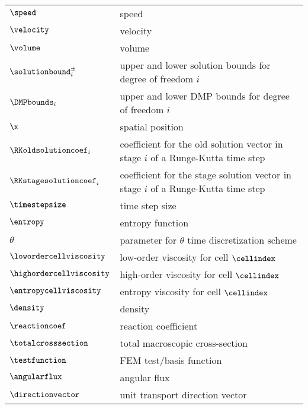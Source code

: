 \begin{center}
\begin{longtable}{l p{4.8in}}
$\speed$           & speed\\
$\velocity$        & velocity\\
$\volume$          & volume\\
$\solutionbound_i^\pm$ & upper and lower solution bounds for degree of freedom $i$\\
$\DMPbounds_i$     & upper and lower DMP bounds for degree of freedom $i$\\
$\x$               & spatial position\\
$\RKoldsolutioncoef_i$ & coefficient for the old solution vector in stage
                         $i$ of a Runge-Kutta time step\\
$\RKstagesolutioncoef_i$ & coefficient for the stage solution vector in stage
                           $i$ of a Runge-Kutta time step\\
$\timestepsize$    & time step size\\
$\entropy$         & entropy function\\
$\theta$           & parameter for $\theta$ time discretization scheme\\

$\lowordercellviscosity$  & low-order viscosity for cell $\cellindex$\\
$\highordercellviscosity$ & high-order viscosity for cell $\cellindex$\\
$\entropycellviscosity$   & entropy viscosity for cell $\cellindex$\\
$\density$         & density\\
$\reactioncoef$    & reaction coefficient\\
$\totalcrosssection$ & total macroscopic cross-section\\
$\testfunction$    & FEM test/basis function\\
$\angularflux$     & angular flux\\
$\directionvector$ & unit transport direction vector\\
\end{longtable}
\end{center}

\pagebreak{}
